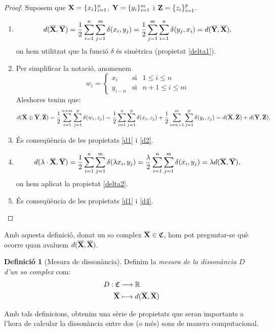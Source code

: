 \documentclass{article}
\theoremstyle{definition}
\newtheorem{definition}{Definició}[section]
\newcommand{\0}{\ensuremath{\vb{0}}}
\newcommand{\X}{\ensuremath{\vb{X}}}
\newcommand{\Y}{\ensuremath{\vb{Y}}}
\newcommand{\Z}{\ensuremath{\vb{Z}}}
\newcommand{\RR}{\ensuremath{\mathbb{R}}} %
\begin{document}
\begin{proof}
    Suposem que $\X=\{x_i\}_{i=1}^n$, $\Y=\{y_i\}_{i=1}^m$ i $\Z=\{z_i\}_{i=1}^p$.
    \begin{enumerate}[label=$d$\arabic*)]
        \item $$d(\overline{\X},\overline{\Y})=\frac{1}{2}\sum_{i=1}^n\sum_{j=1}^m\delta(x_i,y_j)=\frac{1}{2}\sum_{j=1}^m\sum_{i=1}^n\delta(y_j,x_i)=d(\overline{\Y},\overline{\X}),$$ on hem utilitzat que la funció $\delta$ és simètrica (propietat \ref{delta1}).
        \item Per simplificar la notació, anomenem 
        $$
        w_i=\left\{
        \begin{array}{ccc}
            x_i & \text{si} & 1\leq i\leq n\\
            y_{i-n} & \text{si} & n+1\leq i\leq m
        \end{array}\right.
        $$ Aleshores tenim que: $$d(\overline{\X}\oplus\overline{\Y},\overline{\Z})=\frac{1}{2}\sum_{i=1}^{n+m}\sum_{j=1}^p\delta(w_i,z_j)=\frac{1}{2}\sum_{i=1}^n\sum_{j=1}^p\delta(x_i,z_j)+\frac{1}{2}\sum_{i=n+1}^m\sum_{j=1}^p\delta(y_i,z_j)=d(\overline{\X},\overline{\Z})+d(\overline{\Y},\overline{\Z}).$$
        \item És conseqüència de les propietats \ref{d1} i \ref{d2}.
        \item $$d(\lambda\cdot\overline{\X},\overline{\Y})=\frac{1}{2}\sum_{i=1}^n\sum_{j=1}^m\delta(\lambda x_i,y_j)=\frac{\lambda}{2}\sum_{i=1}^n\sum_{j=1}^m\delta(x_i,y_j)=\lambda d(\overline{\X},\overline{\Y}),$$ on hem aplicat la propietat \ref{delta2}.
        \item És conseqüència de les propietats \ref{d1} i \ref{d4}.
    \end{enumerate}
\end{proof}
Amb aquesta definició, donat un so complex $\overline{\X}\in\mathfrak{C}$, hom pot preguntar-se què ocorre quan avaluem $d(\overline{\X},\overline{\X})$.
\begin{definition}[Mesura de dissonància]
    Definim la \textit{mesura de la dissonància $D$ d'un so complex} com:
    \begin{align*}
        D:\mathfrak{C}&\longrightarrow\RR\\
        \overline{\X}&\longmapsto d(\overline{\X},\overline{\X})
    \end{align*}
\end{definition}
Amb tals definicions, obtenim una sèrie de propietats que seran importants a l'hora de calcular la dissonància entre dos (o més) sons de manera computacional.
\end{document}
